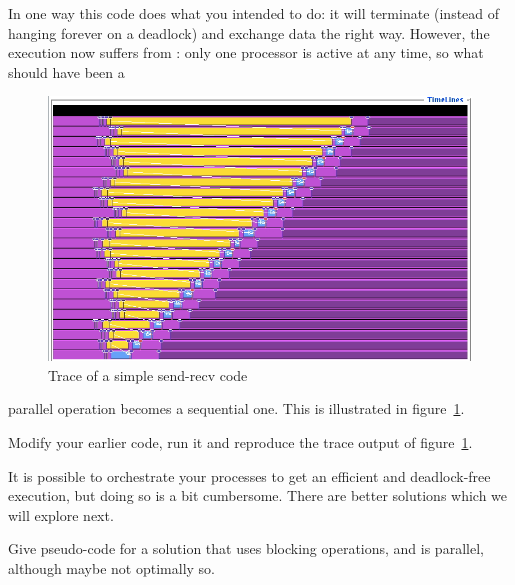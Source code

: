 In one way this code does what you intended to do:
it will terminate (instead of hanging forever on a
deadlock) and exchange data the right way. However, the execution
now suffers from : only
one processor is active at any time, so what should have been a
\begin{figure}[ht]
\includegraphics[scale=.4]{graphics/linear-serial}
\caption{Trace of a simple send-recv code}
\label{fig:serialization}
\end{figure}
parallel operation becomes a sequential one. This is illustrated in
figure~\ref{fig:serialization}.
\begin{exercise}
\label{ex:linear-sequential}
  Modify your earlier code, run it and reproduce the trace output 
  of figure~\ref{fig:serialization}.
\end{exercise}
It is possible to orchestrate your processes to get an efficient and
deadlock-free execution, but doing so is a bit cumbersome.
There are better solutions which we will
explore next.

\begin{exercise}
  Give pseudo-code for a solution that uses blocking operations, and is
  parallel, although maybe not optimally so.
\end{exercise}

